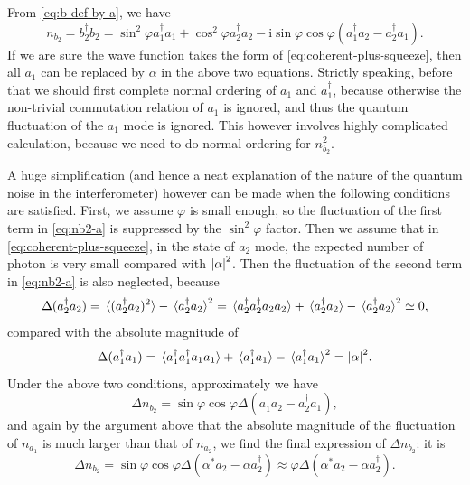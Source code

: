 \documentclass[hyperref, a4paper]{article}
\newcommand*{\ii}{\mathrm{i}}
\begin{document}
From \eqref{eq:b-def-by-a}, we have 
\begin{equation}
    n_{b_2} = b_2^\dagger b_2 = 
    \sin^2 \varphi a_1^\dagger a_1 + \cos^2 \varphi a_2^\dagger a_2
    - \ii \sin \varphi \cos \varphi (a_1^\dagger a_2 - a_2^\dagger a_1).
    \label{eq:nb2-a}
\end{equation}
If we are sure the wave function takes the form of \eqref{eq:coherent-plus-squeeze},
then all $a_1$ can be replaced by $\alpha$ in the above two equations.
Strictly speaking, before that we should first complete normal ordering of $a_1$ and $a_1^\dagger$,
because otherwise the non-trivial commutation relation of $a_1$ is ignored,
and thus the quantum fluctuation of the $a_1$ mode is ignored.
This however involves highly complicated calculation,
because we need to do normal ordering for $n_{b_2}^2$.

A huge simplification 
(and hence a neat explanation of the nature of the quantum noise in the interferometer) 
however can be made when the following conditions are satisfied.
First, we assume $\varphi$ is small enough, 
so the fluctuation of the first term in \eqref{eq:nb2-a} is suppressed by the $\sin^2 \varphi$ factor.
Then we assume that in \eqref{eq:coherent-plus-squeeze},
in the state of $a_2$ mode, the expected number of photon 
is very small compared with $\abs{\alpha}^2$.
Then the fluctuation of the second term in \eqref{eq:nb2-a} is also neglected,
because 
\begin{equation}
    \Delta (a_2^\dagger a_2) = \expval*{ (a_2^\dagger a_2)^2 } - \expval*{ a_2^\dagger a_2 }^2 = 
    \expval*{a_2^\dagger a_2^\dagger a_2 a_2} + \expval*{a_2^\dagger a_2} - \expval*{ a_2^\dagger a_2 }^2 \simeq 0,
\end{equation}
compared with the absolute magnitude of 
\begin{equation}
    \Delta (a_1^\dagger a_1) = 
    \expval*{a_1^\dagger a_1^\dagger a_1 a_1} + \expval*{a_1^\dagger a_1} - \expval*{ a_1^\dagger a_1 }^2 
    = \abs{\alpha}^2.
\end{equation}
Under the above two conditions, approximately we have 
\begin{equation}
    \Delta n_{b_2} = \sin \varphi \cos \varphi \Delta (a_1^\dagger a_2 - a_2^\dagger a_1 ) ,
\end{equation}
and again by the argument above that 
the absolute magnitude of the fluctuation of $n_{a_1}$ 
is much larger than that of $n_{a_2}$,
we find the final expression of $\Delta n_{b_2}$: 
it is 
\begin{equation}
    \Delta n_{b_2} = \sin \varphi \cos \varphi \Delta (\alpha^* a_2 - \alpha a_2^\dagger)
    \approx \varphi \Delta (\alpha^* a_2 - \alpha a_2^\dagger).
    \label{eq:nb2-single-mode}
\end{equation}
\end{document}
